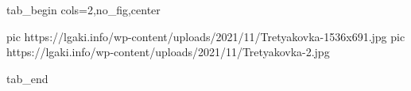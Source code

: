  
 
 
 
 

\ifcmt
  tab_begin cols=2,no_fig,center

     pic https://lgaki.info/wp-content/uploads/2021/11/Tretyakovka-1536x691.jpg
		 pic https://lgaki.info/wp-content/uploads/2021/11/Tretyakovka-2.jpg

  tab_end
\fi
